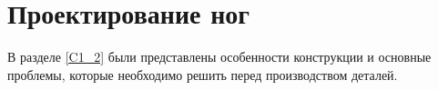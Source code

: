   
  


\section{Проектирование ног}\label{C4_2}

В разделе \ref{C1_2} были представлены особенности конструкции и основные проблемы, которые необходимо решить перед производством деталей. 

